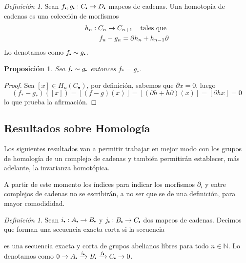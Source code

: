 \documentclass[aop]{imsart2}
\theoremstyle{plain}
\newtheorem{prop}[teo]{Proposición}
\theoremstyle{remark}
\newtheorem{dfn}[teo]{Definición}
\newcommand{\htext}[1]{\hspace{4mm}\text{#1 }}
\newcommand\sbullet[1][.5]{\mathbin{\vcenter{\hbox{\scalebox{#1}{$\bullet$}}}}}
\def \N {\mathbb{N}}
\begin{document}
\begin{dfn}
    Sean $f_{\sbullet},g_{\sbullet}:C_{\sbullet}\to D_{\sbullet}$ mapeos de cadenas. Una 
    homotopía de cadenas es una colección de morfismos
    \begin{align*}
        h_{n}:C_{n}\to C_{n+1}\htext{tales que} \\
        f_{n}-g_{n}=\partial h_{n}+h_{n-1}\partial
    \end{align*}
    Lo denotamos como $f_{\sbullet}\sim g_{\sbullet}$.
\end{dfn}

\begin{prop}
    Sea $f_{\sbullet}\sim g_{\sbullet}$ entonces $f_{*}=g_{*}$.
\end{prop}

\begin{proof}
    Sea $[x]\in H_{n}(C_{\bullet})$, por definición, sabemos que $\partial x=0$, luego
    \begin{equation*}
        (f_{*}-g_{*})([x])=[(f-g)(x)]=[(\partial h+h\partial)(x)]=[\partial hx]=0
    \end{equation*}
    lo que prueba la afirmación.
\end{proof}

\subsection{Resultados sobre Homología}
Los siguientes resultados van a permitir trabajar en mejor modo con los grupos de homología de
un complejo de cadenas y también permitirán establecer, más adelante, la invarianza homotópica.

\vspace{1mm}
\noindent A partir de este momento los índices para indicar los morfismos $\partial_{i}$ y entre 
complejos de cadenas no se escribirán, a no ser que se de una definición, para mayor comodididad. 

\begin{dfn}
    Sean $i_{\sbullet}:A_{\sbullet}\to B_{\sbullet}$ y $j_{\sbullet}:B_{\sbullet}\to C_{\sbullet}$
    dos mapeos de cadenas. Decimos que forman una secuencia exacta corta si la secuencia

    \vspace{2mm}
    \centerline{
    }
    \vspace{2mm}
    \noindent es una secuencia exacta y corta de grupos abelianos libres para todo $n\in\N$. Lo 
    denotamos como $0\xrightarrow[]{} A_{\sbullet}\xrightarrow[]{i_{\sbullet}} 
    B_{\sbullet}\xrightarrow[]{j_{\sbullet}} C_{\sbullet}\xrightarrow[]{}0$.
\end{dfn}
\end{document}
